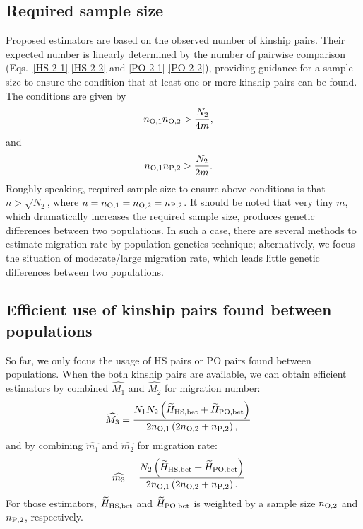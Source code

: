 \documentclass[12pt, English]{article}
\begin{document}
\begin{spacing}{1.9}
\subsection{Required sample size}

Proposed estimators are based on the observed number of kinship pairs. Their expected number is linearly determined by the number of pairwise comparison (Eqs.~\ref{HS-2-1}-\ref{HS-2-2} and \ref{PO-2-1}-\ref{PO-2-2}), providing guidance for a sample size to ensure the condition that at least one or more kinship pairs can be found. The conditions are given by
\begin{align}
n_{\rm O, 1} n_{\rm O, 2} &> \frac{ N_{2} } { 4m },
\label{RS-1}
\end{align}
and
\begin{align}
n_{\rm O, 1} n_{\rm P, 2} &> \frac{ N_{2} } { 2m }.
\label{RS-2}
\end{align}
Roughly speaking, required sample size to ensure above conditions is that $n>\sqrt{N_2}$, where $n = n_{\rm O, 1}=n_{\rm O, 2}=n_{\rm P, 2}$. It should be noted that very tiny $m$, which dramatically increases the required sample size, produces genetic differences between two populations. In such a case, there are several methods to estimate migration rate by population genetics technique; alternatively, we focus the situation of moderate/large migration rate, which leads little genetic differences between two populations. 

\subsection{Efficient use of kinship pairs found between populations}

So far, we only focus the usage of HS pairs or PO pairs found between populations. When the both kinship pairs are available, we can obtain efficient estimators by combined $\widehat{M_1}$ and $\widehat{M_2}$ for migration number: 
\begin{align}
\widehat{M_3} &= \frac{ N_{1} N_{2} \left(\widetilde{H}_{\rm HS,bet} + \widetilde{H}_{\rm PO,bet}\right) } {2n_{\rm O, 1} \left(2 n_{\rm O, 2} + n_{\rm P, 2}\right), }
\label{AP-1}
\end{align}
and by combining $\widehat{m_1}$ and $\widehat{m_2}$ for migration rate: 
\begin{align}
\widehat{m_3} &= \frac{ N_{2} \left(\widetilde{H}_{\rm HS,bet} + \widetilde{H}_{\rm PO,bet}\right) } {2n_{\rm O, 1} \left(2 n_{\rm O, 2} + n_{\rm P, 2}\right). }
\label{AP-2}
\end{align}
For those estimators, $\widetilde{H}_{\rm HS,bet}$ and $\widetilde{H}_{\rm PO,bet}$ is weighted by a sample size $n_{\rm O, 2}$ and $n_{\rm P, 2}$, respectively. 


\end{spacing}
\end{document}
